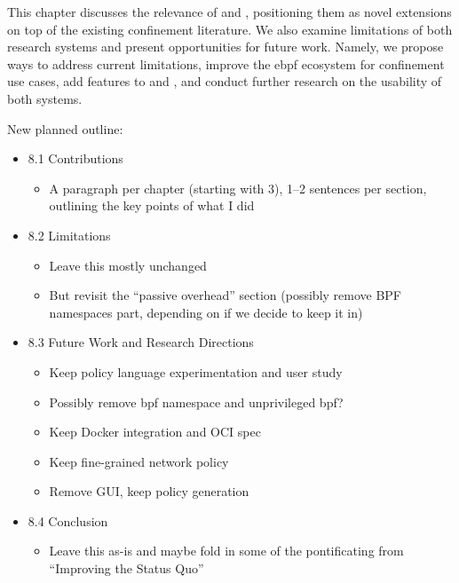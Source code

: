 This chapter discusses the relevance of \bpfbox{} and \bpfcontain{}, positioning them as
novel extensions on top of the existing confinement literature. We also examine
limitations of both research systems and present opportunities for future work. Namely, we
propose ways to address current limitations, improve the \gls{ebpf} ecosystem for
confinement use cases, add features to \bpfbox{} and \bpfcontain{}, and conduct further
research on the usability of both systems.

\begin{inprogress}
  New planned outline:
  \begin{itemize}
    \item 8.1 Contributions
    \begin{itemize}
      \item A paragraph per chapter (starting with 3), 1--2 sentences per section,
            outlining the key points of what I did
    \end{itemize}
    \item 8.2 Limitations
    \begin{itemize}
      \item Leave this mostly unchanged
      \item But revisit the \enquote{passive overhead} section (possibly remove BPF
      namespaces part, depending on if we decide to keep it in)
    \end{itemize}
    \item 8.3 Future Work and Research Directions
    \begin{itemize}
      \item Keep policy language experimentation and user study
      \item Possibly remove \gls{bpf} namespace and unprivileged \gls{bpf}?
      \item Keep Docker integration and OCI spec
      \item Keep fine-grained network policy
      \item Remove GUI, keep policy generation
    \end{itemize}
    \item 8.4 Conclusion
    \begin{itemize}
      \item Leave this as-is and maybe fold in some of the pontificating from
            \enquote{Improving the Status Quo}
    \end{itemize}
  \end{itemize}
\end{inprogress}

